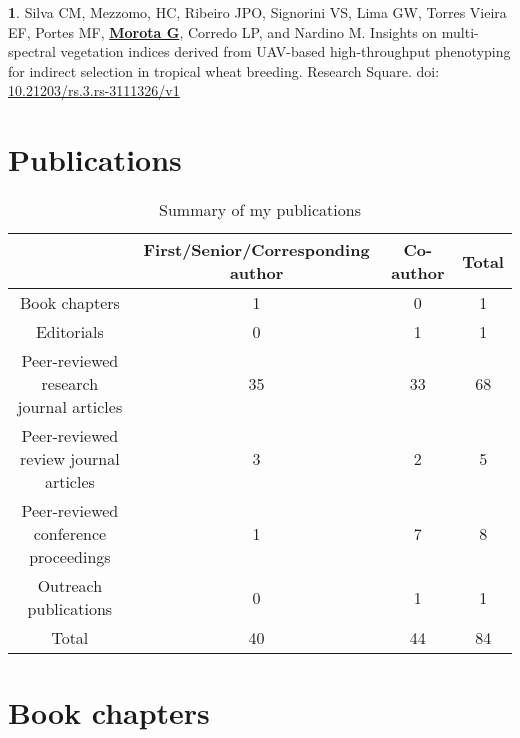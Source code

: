\documentclass[margin,line,10pt]{res}
\newenvironment{list1}{
  \begin{list}{\ding{113}}{%
      \setlength{\itemsep}{0in}
      \setlength{\parsep}{0in} \setlength{\parskip}{0in}
      \setlength{\topsep}{0in} \setlength{\partopsep}{0in} 
      \setlength{\leftmargin}{0.17in}}}{\end{list}}
\begin{document}
\begin{resume}
\begin{list1}
  \vspace{0.5cm}

  \item  [{\bf 1}.]  Silva CM, Mezzomo, HC, Ribeiro JPO, Signorini VS, Lima GW, Torres Vieira EF, Portes MF, \textbf{\underline{Morota G}}, Corredo LP, and Nardino M. Insights on multi-spectral vegetation indices derived from UAV-based high-throughput phenotyping for indirect selection in tropical wheat breeding. Research Square. doi: \textcolor{blue}{\href{https://doi.org/10.21203/rs.3.rs-3111326/v1}{10.21203/rs.3.rs-3111326/v1}}

\end{list1}

  
\vspace{0.5cm}


\section{\sc Publications}
\vspace{1cm}

\begin{table}[h!]
\centering
  \begin{tabular}{ |c|c|c|c| }
 \hline
 & First/Senior/Corresponding author & Co-author & Total \\  \hline
 Book chapters & 1 & 0 & 1 \\ \hline
 Editorials & 0 & 1 & 1 \\ \hline
 Peer-reviewed research journal articles  & 35 & 33 & 68 \\  \hline
 Peer-reviewed review journal articles  & 3 & 2 & 5 \\  \hline
 Peer-reviewed conference proceedings & 1 & 7 & 8 \\ \hline
 Outreach publications & 0 & 1 & 1 \\ \hline
 Total & 40 &  44 & 84 \\ \hline
  \end{tabular}
    \caption{Summary of my publications}
\end{table}


\vspace{1.5cm}
\section{\sc Book chapters}
\vspace{1.0cm}

\section{}
\begin{list1}


\end{list1}
\end{resume}
\end{document}
